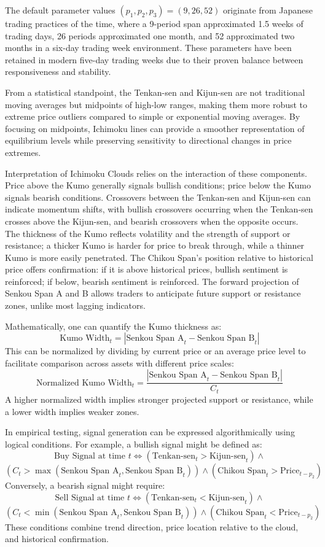 The default parameter values $(p_1, p_2, p_3) = (9, 26, 52)$ originate from Japanese trading practices of the time, where a 9-period span approximated 1.5 weeks of trading days, 26 periods approximated one month, and 52 approximated two months in a six-day trading week environment. These parameters have been retained in modern five-day trading weeks due to their proven balance between responsiveness and stability.

From a statistical standpoint, the Tenkan-sen and Kijun-sen are not traditional moving averages but midpoints of high-low ranges, making them more robust to extreme price outliers compared to simple or exponential moving averages. By focusing on midpoints, Ichimoku lines can provide a smoother representation of equilibrium levels while preserving sensitivity to directional changes in price extremes.

Interpretation of Ichimoku Clouds relies on the interaction of these components. Price above the Kumo generally signals bullish conditions; price below the Kumo signals bearish conditions. Crossovers between the Tenkan-sen and Kijun-sen can indicate momentum shifts, with bullish crossovers occurring when the Tenkan-sen crosses above the Kijun-sen, and bearish crossovers when the opposite occurs. The thickness of the Kumo reflects volatility and the strength of support or resistance; a thicker Kumo is harder for price to break through, while a thinner Kumo is more easily penetrated. The Chikou Span’s position relative to historical price offers confirmation: if it is above historical prices, bullish sentiment is reinforced; if below, bearish sentiment is reinforced. The forward projection of Senkou Span A and B allows traders to anticipate future support or resistance zones, unlike most lagging indicators.

Mathematically, one can quantify the Kumo thickness as:
\[
\text{Kumo Width}_t = |\text{Senkou Span A}_t - \text{Senkou Span B}_t|
\]
This can be normalized by dividing by current price or an average price level to facilitate comparison across assets with different price scales:
\[
\text{Normalized Kumo Width}_t = \frac{|\text{Senkou Span A}_t - \text{Senkou Span B}_t|}{C_t}
\]
A higher normalized width implies stronger projected support or resistance, while a lower width implies weaker zones.

In empirical testing, signal generation can be expressed algorithmically using logical conditions. For example, a bullish signal might be defined as:
\[
\text{Buy Signal at time } t \iff ( \text{Tenkan-sen}_t > \text{Kijun-sen}_t ) \land 
\]
\[
( C_t > \max(\text{Senkou Span A}_t, \text{Senkou Span B}_t) ) \land ( \text{Chikou Span}_t > \text{Price}_{t-p_2} )
\]
Conversely, a bearish signal might require:
\[
\text{Sell Signal at time } t \iff ( \text{Tenkan-sen}_t < \text{Kijun-sen}_t ) \land 
\]
\[
( C_t < \min(\text{Senkou Span A}_t, \text{Senkou Span B}_t) ) \land ( \text{Chikou Span}_t < \text{Price}_{t-p_2} )
\]
These conditions combine trend direction, price location relative to the cloud, and historical confirmation.

